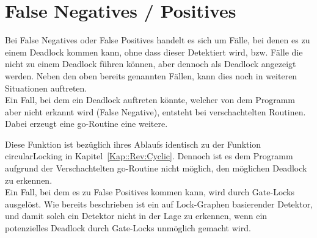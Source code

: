 \section{False Negatives / Positives} \label{Kap::Rev:False}
Bei False Negatives oder False Positives handelt es sich um Fälle, bei denen es 
zu einem Deadlock kommen kann, ohne dass dieser Detektiert wird, bzw. Fälle die
nicht zu einem 
Deadlock führen können, aber dennoch als Deadlock angezeigt werden. 
Neben den oben bereits genannten Fällen, kann dies noch in weiteren Situationen
auftreten.\\
Ein Fall,
bei dem ein Deadlock auftreten könnte, welcher von dem Programm aber nicht erkannt
wird (False Negative), entsteht bei verschachtelten Routinen. Dabei erzeugt eine go-Routine eine 
weitere.
\begin{figure}[H]
    
\end{figure}
Diese Funktion ist bezüglich ihres Ablaufs identisch zu der Funktion 
circularLocking in Kapitel~\ref*{Kap::Rev:Cyclic}. Dennoch ist es dem 
Programm aufgrund der Verschachtelten go-Routine nicht möglich, den möglichen 
Deadlock zu erkennen. \\
Ein Fall, bei dem es zu False Positives kommen kann, wird durch Gate-Locks
ausgelöst. Wie bereits beschrieben ist ein auf Lock-Graphen basierender Detektor,
und damit solch ein Detektor nicht in der Lage zu erkennen, wenn ein 
potenzielles Deadlock durch Gate-Locks unmöglich gemacht wird.
